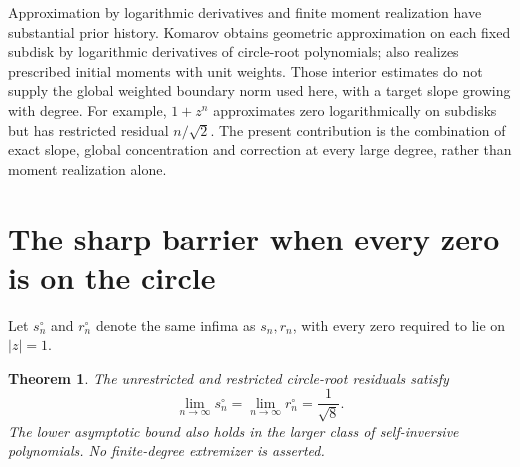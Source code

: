 \documentclass[11pt]{article}
\newtheorem{theorem}{Theorem}
\theoremstyle{remark}\newtheorem{remark}[theorem]{Remark}
\begin{document}
Approximation by logarithmic derivatives and finite moment realization
have substantial prior history. Komarov \cite{komarovrate} obtains
geometric approximation on each fixed subdisk by logarithmic
derivatives of circle-root polynomials; \cite{komarovmoments}
also realizes prescribed initial moments with unit weights.
Those interior estimates do not supply the global weighted boundary
norm used here, with a target slope growing with degree. For example,
\(1+z^n\) approximates zero logarithmically on subdisks but has
restricted residual \(n/\sqrt2\). The present contribution is the
combination of exact slope, global concentration and correction at
every large degree, rather than moment realization alone.


\section{The sharp barrier when every zero is on the circle}\label{sec:circle}
Let \(s_n^\circ\) and \(r_n^\circ\) denote the same infima as
\(s_n,r_n\), with every zero required to lie on \(|z|=1\).

\begin{theorem}\label{thm:circle}
The unrestricted and restricted circle-root residuals satisfy
\[
 \lim_{n\to\infty}s_n^\circ
 =\lim_{n\to\infty}r_n^\circ=\frac1{\sqrt8}.
\]
The lower asymptotic bound also holds in the larger class of
self-inversive polynomials. No finite-degree extremizer is asserted.
\end{theorem}
\end{document}
